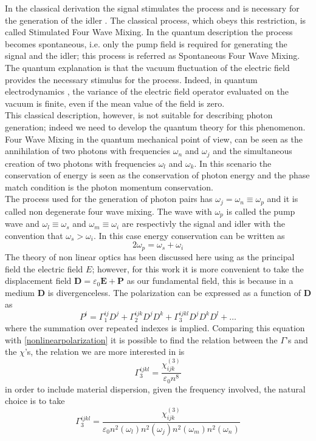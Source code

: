 \documentclass[12pt]{book}
\begin{document}
In the classical derivation the signal stimulates the process and is necessary for the generation of the idler \cite{phdthesis:borghi}. The classical process, which obeys this restriction, is called Stimulated Four Wave Mixing. In the quantum description the process becomes spontaneous, i.e. only the pump field is required for generating the signal and the idler; this process is referred as Spontaneous Four Wave Mixing. The quantum explanation is that the vacuum fluctuation of the electric field provides the necessary stimulus for the process. Indeed, in quantum electrodynamics \cite{book:cohen}, the variance of the electric field operator evaluated on the vacuum is finite, even if the mean value of the field is zero.\\
This classical description, however, is not suitable for describing photon generation; indeed we need to develop the quantum theory for this phenomenon. Four Wave Mixing in the quantum mechanical point of view, can be seen as the annihilation of two photons with frequencies $\omega_n$ and $\omega_j$ and the simultaneous creation of two photons with frequencies $\omega_l$ and $\omega_k$. In this scenario the conservation of energy is seen as the conservation of photon energy and the phase match condition is the photon momentum conservation.\\
The process used for the generation of photon pairs has $\omega_j = \omega_n \equiv \omega_p$ and it is called non degenerate four wave mixing. The wave with $\omega_p$ is called the pump wave and $\omega_l\equiv \omega_s$ and $\omega_m \equiv \omega_i$ are respectivly the signal and idler with the convention that $\omega_s > \omega_i$. In this case energy conservation can be written as
\begin{equation}\label{conservationenergy}2\omega_p = \omega_s + \omega_i\end{equation}
The theory of non linear optics has been discussed here using as the principal field the electric field $E$; however, for this work it is more convenient to take the displacement field $\mathbf{D} = \varepsilon_0\mathbf{E} +\mathbf{P} $ as our fundamental field, this is because in a medium $\mathbf{D}$ is divergenceless. The polarization can be expressed as a function of $\mathbf{D}$ as
\begin{equation}P^i = \Gamma^{ij}_1D^j +\Gamma_2^{ijk}D^jD^k + \Gamma_3^{ijkl}D^jD^kD^l + \dots\end{equation}
where the summation over repeated indexes is implied. Comparing this equation with \eqref{nonlinearpolarization} it is possible to find the relation between the $\Gamma$'s and the $\chi$'s, the relation we are more interested in is \cite{Helt2012}
\begin{equation}\Gamma_3^{ijkl} = \frac{\chi_{ijk}^{(3)}}{\varepsilon_0 n^8}\end{equation}
in order to include material dispersion, given the frequency involved, the natural choice is to take
\begin{equation}\Gamma_3^{ijkl} = \frac{\chi_{ijk}^{(3)}}{\varepsilon_0 n^2(\omega_l)n^2(\omega_j)n^2(\omega_m)n^2(\omega_n)}\end{equation}
{}
\end{document}
